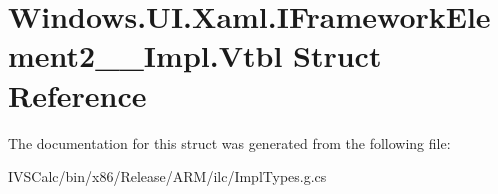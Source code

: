 \hypertarget{struct_windows_1_1_u_i_1_1_xaml_1_1_i_framework_element2_____impl_1_1_vtbl}{}\section{Windows.\+U\+I.\+Xaml.\+I\+Framework\+Element2\+\_\+\+\_\+\+Impl.\+Vtbl Struct Reference}
\label{struct_windows_1_1_u_i_1_1_xaml_1_1_i_framework_element2_____impl_1_1_vtbl}


The documentation for this struct was generated from the following file\+:\begin{DoxyCompactItemize}
\item 
I\+V\+S\+Calc/bin/x86/\+Release/\+A\+R\+M/ilc/Impl\+Types.\+g.\+cs\end{DoxyCompactItemize}
